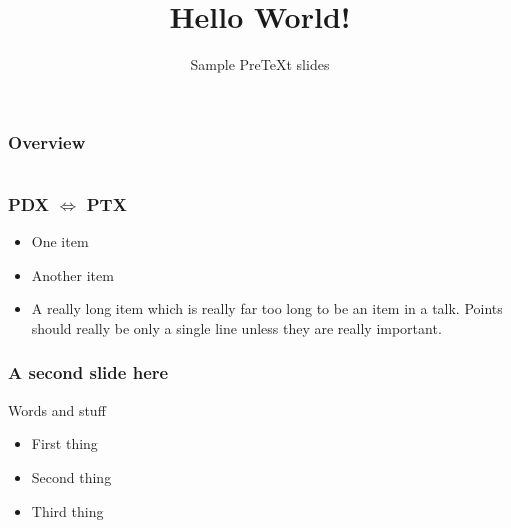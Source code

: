 \documentclass[11pt, compress]{beamer}
\title{Hello World!}
\subtitle{Sample PreTeXt slides}
\begin{document}
\begin{frame}
\maketitle 
\end{frame}
 
\begin{frame}
\frametitle{Overview}
\tableofcontents 
\end{frame}
 

\section{}
\begin{frame}
\frametitle{PDX \(\iff\) PTX}
 \begin{itemize}
\item{}
One item

\item{}
Another item

\item{}
A really long item which is really far too long to be an item in a talk. Points should really be only a single line unless they are really important.
\end{itemize}\end{frame}
 
\begin{frame}
\frametitle{A second slide here}
 
Words and stuff 
\pause 
\begin{itemize}[<+->]
\item{}
First thing

\item{}
Second thing

\item{}
Third thing
\end{itemize}\end{frame}
 
\end{document}
